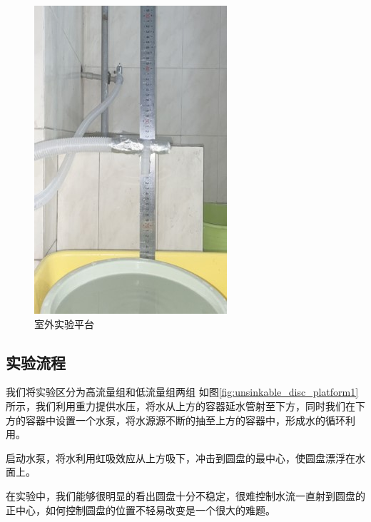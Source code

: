 \documentclass[UTF8]{gapd}
\begin{document}
\begin{figure}[!htbp]%
  \centering
  \includegraphics[width=0.8\columnwidth]{images/platform2.jpg}
  \caption{室外实验平台}
  \label{fig:unsinkable_disc_platform2}%
\end{figure}

\subsection{实验流程}
我们将实验区分为高流量组和低流量组两组
如图\ref{fig:unsinkable_disc_platform1}所示，我们利用重力提供水压，将水从上方的容器延水管射至下方，同时我们在下方的容器中设置一个水泵，将水源源不断的抽至上方的容器中，形成水的循环利用。

启动水泵，将水利用虹吸效应从上方吸下，冲击到圆盘的最中心，使圆盘漂浮在水面上。

在实验中，我们能够很明显的看出圆盘十分不稳定，很难控制水流一直射到圆盘的正中心，如何控制圆盘的位置不轻易改变是一个很大的难题。
\end{document}
